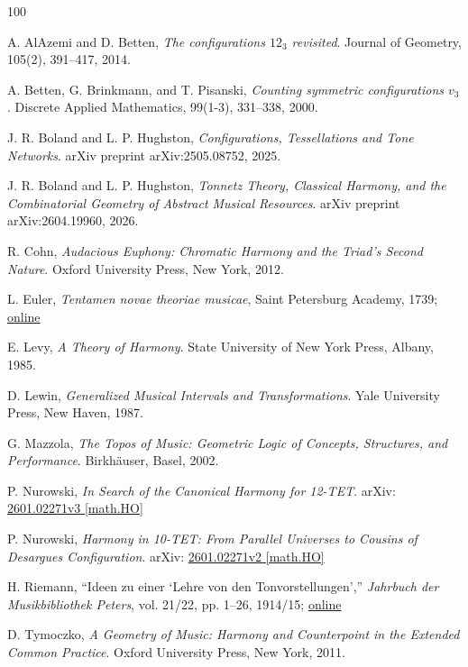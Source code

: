 \documentclass[11pt,letterpaper]{amsart}
\begin{document}
\begin{thebibliography}{100}


A. AlAzemi and D. Betten, 
\emph{The configurations $12_3$ revisited}.
Journal of Geometry, 105(2), 391--417, 2014.

A. Betten, G. Brinkmann, and T. Pisanski, 
\emph{Counting symmetric configurations $v_3$}.
Discrete Applied Mathematics, 99(1-3), 331--338, 2000.

J. R. Boland and L. P. Hughston, 
\emph{Configurations, Tessellations and Tone Networks}.
arXiv preprint arXiv:2505.08752, 2025.

J. R. Boland and L. P. Hughston, 
\emph{Tonnetz Theory, Classical Harmony, and the Combinatorial Geometry of Abstract Musical Resources}.
arXiv preprint arXiv:2604.19960, 2026.

R. Cohn, 
\emph{Audacious Euphony: Chromatic Harmony and the Triad's Second Nature}.
Oxford University Press, New York, 2012.

  L. Euler,
\textit{Tentamen novae theoriae musicae},
Saint Petersburg Academy, 1739; \href{https://scholarlycommons.pacific.edu/cgi/viewcontent.cgi?article=1032&context=euler-works}{online}

E. Levy, 
\emph{A Theory of Harmony}.
State University of New York Press, Albany, 1985.

D. Lewin, 
\emph{Generalized Musical Intervals and Transformations}. 
Yale University Press, New Haven, 1987.

G. Mazzola, 
\emph{The Topos of Music: Geometric Logic of Concepts, Structures, and Performance}. 
Birkhäuser, Basel, 2002.




  
P. Nurowski, 
\emph{In Search of the Canonical Harmony for 12-TET}. 
arXiv: \href{https://arxiv.org/abs/2601.02271v3}{2601.02271v3 [math.HO]}

P. Nurowski, 
\emph{Harmony in 10-TET: From Parallel Universes to Cousins of Desargues Configuration}. 
arXiv: \href{https://arxiv.org/abs/2601.02271v2}{2601.02271v2 [math.HO]}

H. Riemann,
``Ideen zu einer `Lehre von den Tonvorstellungen',''
\textit{Jahrbuch der Musikbibliothek Peters}, vol. 21/22, pp. 1--26, 1914/15; \href{https://www.scribd.com/document/637371695/H-Riemann-Ideen-zu-einer-Lehre-von-den-Tonvorstellungen}{online}

D. Tymoczko, 
\emph{A Geometry of Music: Harmony and Counterpoint in the Extended Common Practice}.
Oxford University Press, New York, 2011.  



\end{thebibliography}
\end{document}
